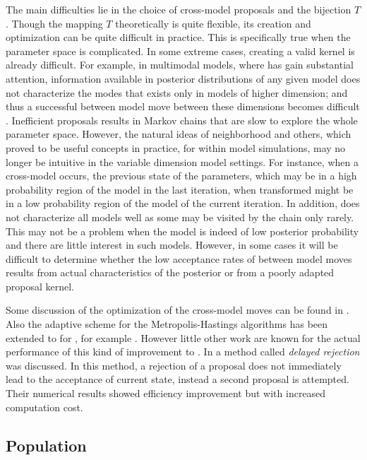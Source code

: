 The main difficulties lie in the choice of cross-model proposals and the
bijection $T$. Though the mapping $T$ theoretically is quite flexible, its
creation and optimization can be quite difficult in practice. This is
specifically true when the parameter space is complicated. In some extreme
cases, creating a valid kernel is already difficult. For example, in
multimodal models, where \rjmcmc has gain substantial attention, information
available in posterior distributions of any given model does not characterize
the modes that exists only in models of higher dimension; and thus a
successful between model move between these dimensions becomes difficult
\cite{Jasra:2007id}. Inefficient proposals results in Markov chains that are
slow to explore the whole parameter space. However, the natural ideas of
neighborhood and others, which proved to be useful concepts in practice, for
within model simulations, may no longer be intuitive in the variable dimension
model settings. For instance, when a cross-model occurs, the previous state of
the parameters, which may be in a high probability region of the model in the
last iteration, when transformed might be in a low probability region of the
model of the current iteration. In addition, \rjmcmc does not characterize all
models well as some may be visited by the chain only rarely. This may not be a
problem when the model is indeed of low posterior probability and there are
little interest in such models. However, in some cases it will be difficult to
determine whether the low acceptance rates of between model moves results from
actual characteristics of the posterior or from a poorly adapted proposal
kernel.

Some discussion of the optimization of the cross-model moves can be found in
\cite{Green:2009tr}. Also the adaptive scheme for the Metropolis-Hastings
algorithms has been extended to for \rjmcmc, for example \cite{Hastie:2005vi}.
However little other work are known for the actual performance of this kind of
improvement to \rjmcmc. In \cite{Green:2001tk} a method called \emph{delayed
  rejection} was discussed. In this method, a rejection of a proposal does not
immediately lead to the acceptance of current state, instead a second proposal
is attempted. Their numerical results showed efficiency improvement but with
increased computation cost.

\subsection{Population \protect\mcmc}
\label{sub:Population mcmc}

